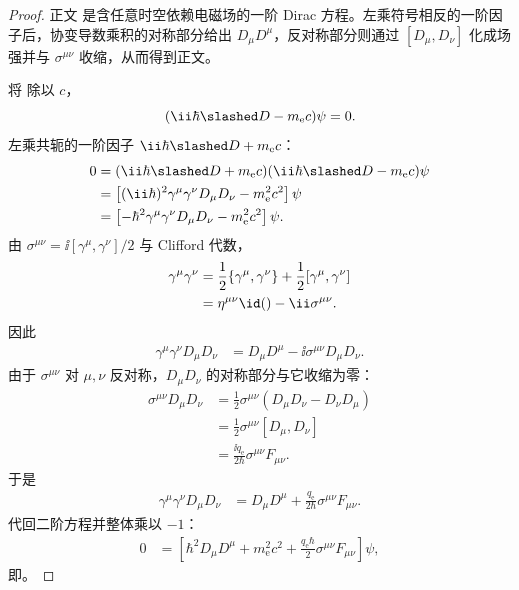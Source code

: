 \begin{proof}
正文 是含任意时空依赖电磁场的一阶 Dirac 方程。左乘符号相反的一阶因子后，协变导数乘积的对称部分给出 $D_\mu D^\mu$，反对称部分则通过 $[D_\mu,D_\nu]$ 化成场强并与 $\sigma^{\mu\nu}$ 收缩，从而得到正文。


将  除以 $c$，
\begin{equation*}
 (\ii\hbar\slashed D-m_{\mathrm e} c)\psi=0.
\end{equation*}
左乘共轭的一阶因子 $\ii\hbar\slashed D+m_{\mathrm e} c$：
\begin{align*}
 0
 &=(\ii\hbar\slashed D+m_{\mathrm e} c)(\ii\hbar\slashed D-m_{\mathrm e} c)\psi\\
 &=\left[(\ii\hbar)^2\gamma^\mu\gamma^\nu D_\mu D_\nu-m_{\mathrm e}^2c^2\right]\psi\\
 &=\left[-\hbar^2\gamma^\mu\gamma^\nu D_\mu D_\nu-m_{\mathrm e}^2c^2\right]\psi.
\end{align*}
由 $\sigma^{\mu\nu}=\ii[\gamma^\mu,\gamma^\nu]/2$ 与 Clifford 代数，
\begin{align*}
 \gamma^\mu\gamma^\nu
 &=\frac12\{\gamma^\mu,\gamma^\nu\}
 +\frac12[\gamma^\mu,\gamma^\nu]\\
 &=\eta^{\mu\nu}\id()-\ii\sigma^{\mu\nu}.
\end{align*}
因此
\begin{align*}
 \gamma^\mu\gamma^\nu D_\mu D_\nu
 &=D_\mu D^\mu-\ii\sigma^{\mu\nu}D_\mu D_\nu.
\end{align*}
由于 $\sigma^{\mu\nu}$ 对 $\mu,\nu$ 反对称，$D_\mu D_\nu$ 的对称部分与它收缩为零：
\begin{align*}
 \sigma^{\mu\nu}D_\mu D_\nu
 &=\frac12\sigma^{\mu\nu}
 (D_\mu D_\nu-D_\nu D_\mu)\\
 &=\frac12\sigma^{\mu\nu}[D_\mu,D_\nu]\\
 &=\frac{\ii q_{\mathrm e}}{2\hbar}\sigma^{\mu\nu}F_{\mu\nu}.
\end{align*}
于是
\begin{align*}
 \gamma^\mu\gamma^\nu D_\mu D_\nu
 &=D_\mu D^\mu
 +\frac{q_{\mathrm e}}{2\hbar}\sigma^{\mu\nu}F_{\mu\nu}.
\end{align*}
代回二阶方程并整体乘以 $-1$：
\begin{align*}
 0
 &=\left[
 \hbar^2D_\mu D^\mu+m_{\mathrm e}^2c^2
 +\frac{q_{\mathrm e}\hbar}{2}\sigma^{\mu\nu}F_{\mu\nu}
 \right]\psi,
\end{align*}
即。
\end{proof}

